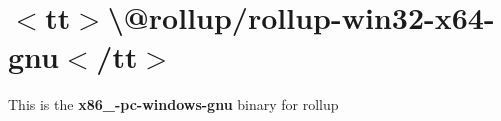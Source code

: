 \chapter{\texorpdfstring{$<$}{<}tt\texorpdfstring{$>$}{>}\textbackslash{}@rollup/rollup-\/win32-\/x64-\/gnu\texorpdfstring{$<$}{<}/tt\texorpdfstring{$>$}{>}}
\hypertarget{md__project5___h_r_2_project5___h_r___front___end_2node__modules_2_0drollup_2rollup-win32-x64-gnu_2_r_e_a_d_m_e}{}\label{md__project5___h_r_2_project5___h_r___front___end_2node__modules_2_0drollup_2rollup-win32-x64-gnu_2_r_e_a_d_m_e}
\label{md__project5___h_r_2_project5___h_r___front___end_2node__modules_2_0drollup_2rollup-win32-x64-gnu_2_r_e_a_d_m_e_autotoc_md396}%
%
 This is the {\bfseries{x86\+\_-\/pc-\/windows-\/gnu}} binary for {\ttfamily rollup} 